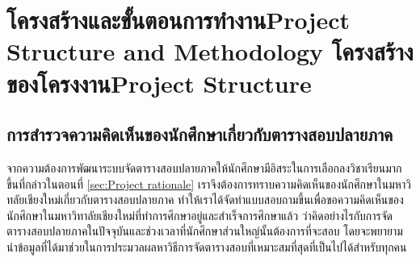 \chapter{\ifproject%
\ifcpe โครงสร้างและขั้นตอนการทำงาน\else Project Structure and Methodology\fi
\else%
\ifcpe โครงสร้างของโครงงาน\else Project Structure\fi
\fi
}


\makeatletter


\makeatother

\section{การสำรวจความคิดเห็นของนักศึกษาเกี่ยวกับตารางสอบปลายภาค}
จากความต้องการพัฒนาระบบจัดตารางสอบปลายภาคให้นักศึกษามีอิสระในการเลือกลงวิชาเรียนมากขึ้นที่กล่าวในตอนที่ \ref{sec:Project rationale} เราจึงต้องการทราบความคิดเห็นของนักศึกษาในมหาวิทลัยเชียงใหม่เกี่ยวกับตารางสอบปลายภาค 
ทำให้เราได้จัดทำแบบสอบถามขึ้นเพื่อขอความคิดเห็นของนักศึกษาในมหาวิทาลัยเชียงใหม่ที่ทำการศึกษาอยู่และสำเร็จการศึกษาแล้ว ว่าคิดอย่างไรกับการจัดตารางสอบปลายภาคในปัจจุบันและช่วงเวลาที่นักศึกษาส่วนใหญ่นั้นต้องการที่จะสอบ 
โดยจะพยายามนำข้อมูลที่ได้มาช่วยในการประมวลผลหาวิธีการจัดตารางสอบที่เหมาะสมที่สุดที่เป็นไปได้สำหรับทุกคน

